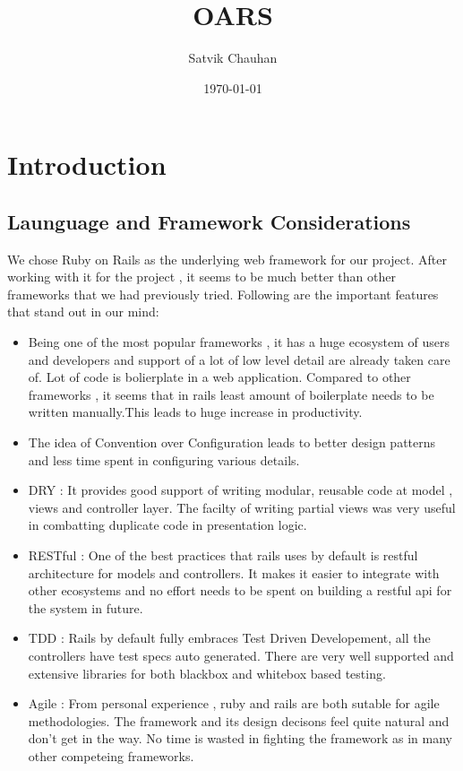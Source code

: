 \documentclass[letterpaper,12pt]{article}
\title{OARS}
\author{Satvik Chauhan}
\date{{\small \today}}
\begin{document}
\maketitle
\section{Introduction}

\subsection{Launguage and Framework Considerations}

We chose Ruby on Rails as the underlying web framework for our
project. After working with it for the project , it seems to be much
better than other frameworks that we had previously tried. Following
are the important features that stand out in our mind:
\begin{itemize}
\item Being one of the most popular frameworks , it has a huge
  ecosystem of users and developers and support of a lot of low level
  detail are already taken care of. Lot of code is bolierplate in a
  web application. Compared to other frameworks , it seems that in
  rails least amount of boilerplate needs to be written manually.This
  leads to huge increase in productivity.
\item The idea of Convention over Configuration leads to better design
  patterns and less time spent in configuring various details.
\item DRY : It provides good support of writing modular, reusable code
  at model , views and controller layer. The facilty of writing
  partial views was very useful in combatting duplicate code in
  presentation logic. 
\item RESTful : One of the best practices that rails uses by default
  is restful architecture for models and controllers. It makes it
  easier to integrate with other ecosystems and no effort needs to be
  spent on building a restful api for the system in future.
\item TDD : Rails by default fully embraces Test Driven Developement,
  all the controllers have test specs auto generated. There are very
  well supported and extensive libraries for both blackbox and
  whitebox based testing.
\item Agile : From personal experience , ruby and rails are both
  sutable for agile methodologies. The framework and its design
  decisons feel quite natural and don't get in the way. No time is
  wasted in fighting the framework as in many other competeing
  frameworks.
\end{itemize}
\end{document}
